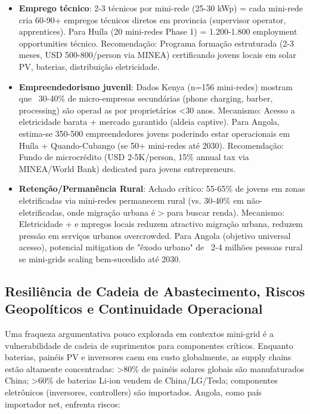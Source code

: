 \documentclass[12pt, a4paper]{article}
\begin{document}
{{{{{{{{{{{{\begin{itemize}
\item \textbf{Emprego técnico}: 2-3 técnicos por mini-rede (25-30 kWp) = cada mini-rede cria 60-90+ empregos técnicos diretos em provincia (supervisor operator, apprentices). Para Huíla (20 mini-redes Phase 1) = 1.200-1.800 employment opportunities técnico. Recomendação: Programa formação estruturada (2-3 meses, USD 500-800/person via MINEA) certificando jovens locais em solar PV, baterias, distribuição eletricidade.

\item \textbf{Empreendedorismo juvenil}:  Dados Kenya (n=156 mini-redes) mostram que ~30-40\% de micro-empresas secundárias (phone charging, barber, processing) são operad as por proprietários <30 anos. Mecanismo: Acesso a eletricidade barata + mercado garantido (aldeia captive). Para Angola, estima-se 350-500 empreendedores jovens poderindo estar operacionais em Huíla + Quando-Cubango (se 50+ mini-redes até 2030). Recomendação: Fundo de microcrédito (USD 2-5K/person, 15\% annual tax via MINEA/World Bank) dedicated para jovens entrepreneurs.

\item \textbf{Retenção/Permanência Rural}: Achado crítico: 55-65\% de jovens em zonas eletrificadas via mini-redes permanecem rural (vs. 30-40\% em não-eletrificadas, onde migração urbana é > para buscar renda). Mecanismo: Eletricidade + e mpregos locais reduzem atractivo migração urbana, reduzem pressão em serviços urbanos overcrowded. Para Angola (objetivo universal acesso), potencial mitigation de "êxodo urbano" de ~2-4 milhões pessoas rural se mini-grids scaling bem-sucedido até 2030.
\end{itemize}

\subsection{Resiliência de Cadeia de Abastecimento, Riscos Geopolíticos e Continuidade Operacional}

Uma fraqueza argumentativa pouco explorada em contextos mini-grid é a vulnerabilidade de cadeia de suprimentos para componentes críticos. Enquanto baterias, painéis PV e inversores caem em custo globalmente, as supply chains estão altamente concentradas: >80\% de painéis solares globais são manufaturados China; >60\% de baterias Li-ion vendem de China/LG/Tesla; componentes eletrônicos (inversores, controllers) são importados. Angola, como país importador net, enfrenta riscos:

}}}}}}}}}}}}
\end{document}
